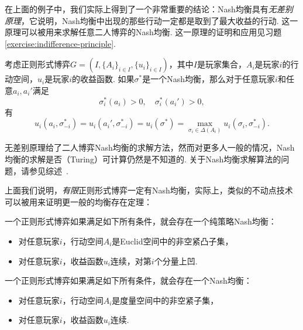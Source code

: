 在上面的例子中，我们实际上得到了一个非常重要的结论：Nash均衡具有\textit{无差别原理}，它说明，Nash均衡中出现的那些行动一定都是取到了最大收益的行动. 这一原理可以被用来求解任意二人博弈的Nash均衡. 这一原理的证明和应用见习题 \ref{exercise:indifference-principle}. 

\begin{theorem}[无差别原理]\label{theorem:indifference-principle}
考虑正则形式博弈$G=(I,\{A_i\}_{i\in I},\{u_i\}_{i\in I})$，其中$I$是玩家集合，$A_i$是玩家$i$的行动空间，$u_i$是玩家$i$的收益函数. 如果$\sigma^*$是一个Nash均衡，那么对于任意玩家$i$和任意$a_i,a_i'$满足
\[\sigma^*_i(a_i)>0,\quad \sigma^*_i(a_i')>0,\]
有
\[u_i(a_i,\sigma^*_{-i})=u_i(a_i',\sigma^*_{-i})=u_i(\sigma^*)=\max_{\sigma_i\in\Delta(A_i)}u_i(\sigma_i,\sigma^*_{-i}).\]
\end{theorem}

\begin{remark}
    无差别原理给了二人博弈Nash均衡的求解方法，然而对更多人一般的情况，Nash均衡的求解是否（Turing）可计算仍然是不知道的. 关于Nash均衡求解算法的问题，请参见综述~\cite{liSurveyAlgorithmsNash2024}.
\end{remark}

上面我们说明，\textit{有限}正则形式博弈一定有Nash均衡，实际上，类似的不动点技术可以被用来证明更一般的均衡存在定理：

\begin{theorem}
    一个正则形式博弈如果满足如下所有条件，就会存在一个纯策略Nash均衡： 
    \begin{itemize}
        \item 对任意玩家$i$，行动空间$A_i$是Euclid空间中的非空紧凸子集，
        \item 对任意玩家$i$，收益函数$u_i$连续，对第$i$个分量上凹. 
    \end{itemize}
\end{theorem}

\begin{theorem}
    一个正则形式博弈如果满足如下所有条件，就会存在一个Nash均衡：
    \begin{itemize}
        \item 对任意玩家$i$，行动空间$A_i$是度量空间中的非空紧子集，
        \item 对任意玩家$i$，收益函数$u_i$连续. 
    \end{itemize}
\end{theorem}

